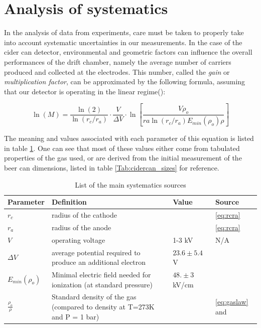 \section{Analysis of systematics}
In the analysis of data from experiments, care must be taken to properly take into account systematic uncertainties in our measurements. In the case of the cider can detector, environmental and geometric factors can influence the overall performances of the drift chamber, namely the average number of carriers produced and collected at the electrodes. This number, called the \textit{gain} or \textit{multiplication factor}, can be approximated by the following formula, assuming that our detector is operating in the linear regime(\cite{gas_detect}):

\begin{equation}
  \label{eq:lnm}
  \ln(M)=\frac{\ln(2)}{\ln(r_{c}/r_{a})}\cdot\frac{V}{\Delta V}\cdot\ln\left[ \frac{V\rho_{o}}{ra\ln(r_{c}/r_{a})E_{min}(\rho_{o})\rho}\right]
\end{equation}

The meaning and values associated with each parameter of this equation is listed in table \ref{Tab:params}. One can see that most of these values either come from tabulated properties of the gas used, or are derived from the initial measurement of the beer can dimensions, listed in table \ref{Tab:cidercan_sizes} for reference.

\begin{table}[htb]
  \begin{tabularx}{\linewidth}{X|X|X|p{2cm}}
    \textbf{Parameter}     & \textbf{Definition}                                                         & \textbf{Value}     & \textbf{Source}    \\ \hline
    $r_{c}$                 & radius of the cathode                                                       &                    &\ref{eq:rcra}       \\
    $r_{a}$                 & radius of the anode                                                         &                    &\ref{eq:rcra}       \\
    $V$                    & operating voltage                                                           & 1-3 kV             & N/A                \\
    $\Delta V$             & average potential required to produce an additional electron                & $23.6 \pm 5.4$ V     &\cite{gas_detect}   \\
    $E_{min}(\rho_{o})$      & Minimal electric field needed for ionization (at standard pressure)         & $48. \pm 3$ kV/cm    &\cite{gas_detect}   \\
    $\frac{\rho_{o}}{\rho}$ & Standard density of the gas (compared to density at  T=273K and P = 1 bar)  &                    &\ref{eq:gaslaw} and \cite{meteo} 
  \end{tabularx}
  \caption{List of the main systematics sources}
  \label{Tab:params}
\end{table}

